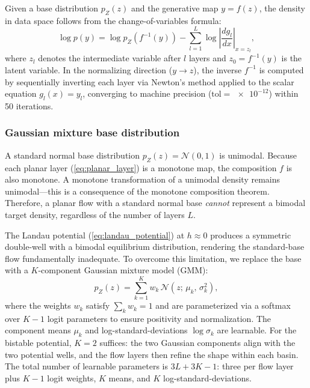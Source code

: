 Given a base distribution $p_Z(z)$ and the generative map $y = f(z)$, the density in data space follows from the change-of-variables formula:
\begin{equation}
    \log p(y) = \log p_Z\!\left(f^{-1}(y)\right) - \sum_{l=1}^{L}\log\left|\frac{dg_l}{dx}\right|_{x = z_l},
    \label{eq:change_of_variables}
\end{equation}
where $z_l$ denotes the intermediate variable after $l$ layers and $z_0 = f^{-1}(y)$ is the latent variable.
In the normalizing direction ($y \to z$), the inverse $f^{-1}$ is computed by sequentially inverting each layer via Newton's method applied to the scalar equation $g_l(x) = y_l$, converging to machine precision ($\text{tol} = \num{e-12}$) within \num{50} iterations.

\subsubsection{Gaussian mixture base distribution}
\label{sec:gmm_base}

A standard normal base distribution $p_Z(z) = \mathcal{N}(0,1)$ is unimodal.
Because each planar layer (\cref{eq:planar_layer}) is a monotone map, the composition $f$ is also monotone.
A monotone transformation of a unimodal density remains unimodal---this is a consequence of the monotone composition theorem.
Therefore, a planar flow with a standard normal base \emph{cannot} represent a bimodal target density, regardless of the number of layers $L$.

The Landau potential (\cref{eq:landau_potential}) at $h \approx 0$ produces a symmetric double-well with a bimodal equilibrium distribution, rendering the standard-base flow fundamentally inadequate.
To overcome this limitation, we replace the base with a $K$-component Gaussian mixture model (GMM):
\begin{equation}
    p_Z(z) = \sum_{k=1}^{K} w_k\,\mathcal{N}(z;\,\mu_k,\,\sigma_k^2),
    \label{eq:gmm_base}
\end{equation}
where the weights $w_k$ satisfy $\sum_k w_k = 1$ and are parameterized via a softmax over $K-1$ logit parameters to ensure positivity and normalization.
The component means $\mu_k$ and log-standard-deviations $\log\sigma_k$ are learnable.
For the bistable potential, $K = 2$ suffices: the two Gaussian components align with the two potential wells, and the flow layers then refine the shape within each basin.
The total number of learnable parameters is $3L + 3K - 1$: three per flow layer plus $K-1$ logit weights, $K$ means, and $K$ log-standard-deviations.


